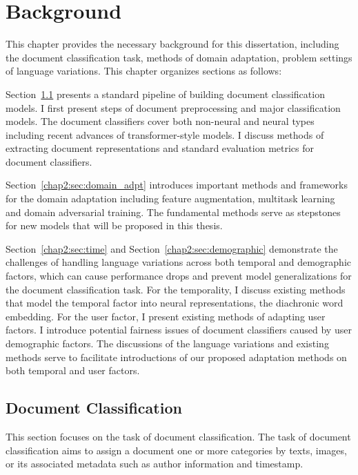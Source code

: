 \chapter{Background}
\label{chp:background}

This chapter provides the necessary background for this dissertation, including the document classification task, methods of domain adaptation, problem settings of language variations.
This chapter organizes sections as follows:

Section~\ref{chap2:sec:doc_clf} presents a standard pipeline of building document classification models.
I first present steps of document preprocessing and major classification models. 
The document classifiers cover both non-neural and neural types including recent advances of transformer-style models. 
I discuss methods of extracting document representations and standard evaluation metrics for document classifiers. 

Section~\ref{chap2:sec:domain_adpt} introduces important methods and frameworks for the domain adaptation including feature augmentation, multitask learning and domain adversarial training. 
The fundamental methods serve as stepstones for new models that will be proposed in this thesis.

Section~\ref{chap2:sec:time} and Section~\ref{chap2:sec:demographic} demonstrate the challenges of handling language variations across both temporal and demographic factors, which can cause performance drops and prevent model generalizations for the document classification task.
For the temporality, I discuss existing methods that model the temporal factor into neural representations, the diachronic word embedding. 
For the user factor, I present existing methods of adapting user factors. I introduce potential fairness issues of document classifiers caused by user demographic factors. 
The discussions of the language variations and existing methods serve to facilitate introductions of our proposed adaptation methods on both temporal and user factors.


\section{Document Classification}
\label{chap2:sec:doc_clf}
This section focuses on the task of document classification.
The task of document classification aims to assign a document one or more categories by texts, images, or its associated metadata such as author information and timestamp.


